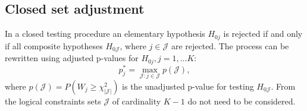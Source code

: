 \documentclass[reqno]{amsart}
\newcommand{\setJ}{\mathcal{J}}
\begin{document}
\subsection{Closed set adjustment}

In a closed testing procedure an elementary hypothesis $H_{0j}$ is rejected if and only if all composite hypotheses $H_{0\setJ}$, where $j\in \setJ$ are rejected. The process can be rewritten using adjusted p-values for $H_{0j}, j=1,\ldots K$:
\begin{equation}\label{E:adjustp}
    p^*_j = \max_{\setJ: j\in \setJ} p(\setJ),
\end{equation}
where $p(\setJ) = P(W_j \geq \chi^2_{|\setJ|})$ is the unadjusted p-value for testing $H_{0\setJ}$. From the logical constraints sets $\setJ$ of cardinality $K-1$ do not need to be considered.
\end{document}
